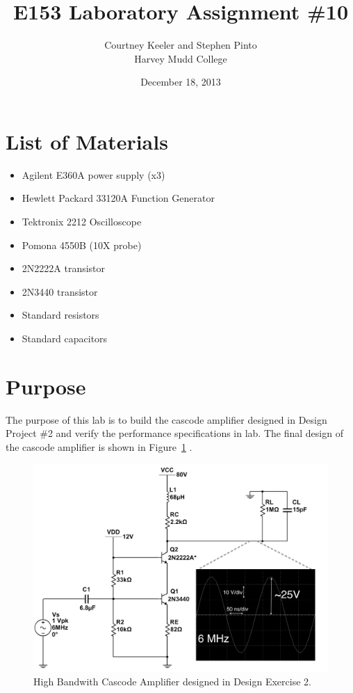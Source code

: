 \documentclass[12pt,letterpaper]{report}
\newlength \figwidth
\begin{document}
\title{E153 Laboratory Assignment \#10}
\author{Courtney Keeler and Stephen Pinto\\
Harvey Mudd College}
\date{December 18, 2013}
\maketitle

\section*{List of Materials}
\begin{itemize}
	\item Agilent E360A power supply (x3)
	\item Hewlett Packard 33120A Function Generator
	\item Tektronix 2212 Oscilloscope
	\item Pomona 4550B (10X probe)
	\item 2N2222A transistor
	\item 2N3440 transistor
	\item Standard resistors
	\item Standard capacitors
\end{itemize}

\section*{Purpose}
The purpose of this lab is to build the cascode amplifier designed in Design Project \#2 and verify the performance specifications in lab. The final design of the cascode amplifier is shown in Figure~\ref{fig:circuit}
.
\begin{figure}[H]
\centering
\includegraphics[width=\figwidth, keepaspectratio=true]{lab10_images/result.png}
\caption{High Bandwith Cascode Amplifier designed in Design Exercise 2.}
\label{fig:circuit}
\end{figure}
\end{document}
